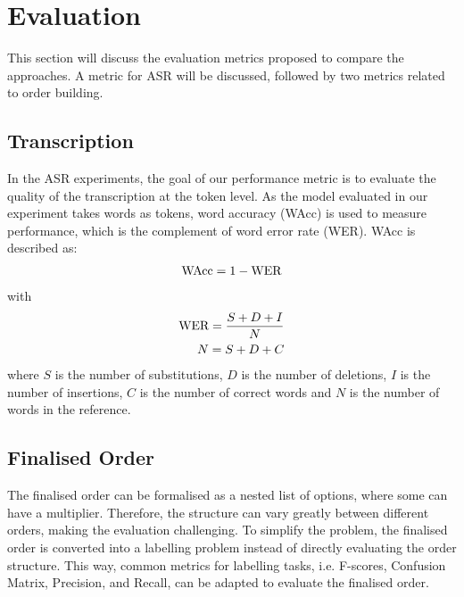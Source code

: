 \section{Evaluation}


This section will discuss the evaluation metrics proposed to compare the approaches. A metric for ASR will be discussed, followed by two metrics related to order building.

\subsection{Transcription}


In the ASR experiments, the goal of our performance metric is to evaluate the quality of the transcription at the token level. As the model evaluated in our experiment takes words as tokens, word accuracy (WAcc) is used to measure performance, which is the complement of word error rate (WER). WAcc is described as:
\begin{eqnarray}
    \textnormal{WAcc} = 1 - \textnormal{WER}
\end{eqnarray}
with
\begin{eqnarray}
    \textnormal{WER} = \frac{S+D+I}{N} \\
    N = S+D+C
\end{eqnarray}
where \(S\) is the number of substitutions, \(D\) is the number of deletions, \(I\) is the number of insertions, \(C\) is the number of correct words and \(N\) is the number of words in the reference.


\subsection{Finalised Order}


The finalised order can be formalised as a nested list of options, where some can have a multiplier. Therefore, the structure can vary greatly between different orders, making the evaluation challenging. To simplify the problem, the finalised order is converted into a labelling problem instead of directly evaluating the order structure. This way, common metrics for labelling tasks, i.e. F-scores, Confusion Matrix, Precision, and Recall, can be adapted to evaluate the finalised order. %

